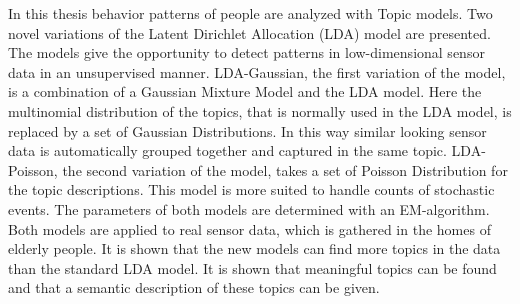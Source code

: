 In this thesis behavior patterns of people are analyzed with Topic models. Two novel variations of the Latent Dirichlet Allocation (LDA) model are presented. The models give the opportunity to detect patterns in low-dimensional sensor data in an unsupervised manner. LDA-Gaussian, the first variation of the model, is a combination of a Gaussian Mixture Model and the LDA model. Here the multinomial distribution of the topics, that is normally used in the LDA model, is replaced by a set of Gaussian Distributions. In this way similar looking sensor data is automatically grouped together and captured in the same topic.
LDA-Poisson, the second variation of the model, takes a set of Poisson Distribution for the topic descriptions. This model is more suited to handle counts of stochastic events. The parameters of both models are determined with an EM-algorithm.
Both models are applied to real sensor data, which is gathered in the homes of elderly people. It is shown that the new models can find more topics in the data than the standard LDA model. It is shown that meaningful topics can be found and that a semantic description of these topics can be given.